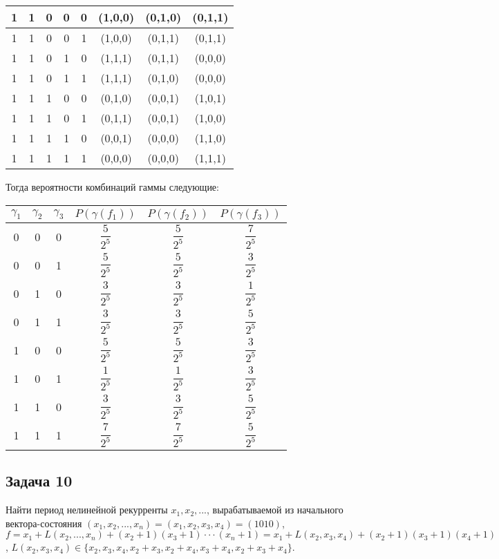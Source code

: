 \documentclass[utf8x, 14pt]{G7-32} %
\begin{document}
\begin{center}
\begin{tabular} { | c | c | c | c | c | c | c | c | }
\hline
1 & 1 & 0 & 0 & 0 & (1,0,0) & (0,1,0) & (0,1,1) \\
\hline
1 & 1 & 0 & 0 & 1 & (1,0,0) & (0,1,1) & (0,1,1) \\
\hline
1 & 1 & 0 & 1 & 0 & (1,1,1) & (0,1,1) & (0,0,0) \\
\hline
1 & 1 & 0 & 1 & 1 & (1,1,1) & (0,1,0) & (0,0,0) \\
\hline
1 & 1 & 1 & 0 & 0 & (0,1,0) & (0,0,1) & (1,0,1) \\
\hline
1 & 1 & 1 & 0 & 1 & (0,1,1) & (0,0,1) & (1,0,0) \\
\hline
1 & 1 & 1 & 1 & 0 & (0,0,1) & (0,0,0) & (1,1,0) \\
\hline
1 & 1 & 1 & 1 & 1 & (0,0,0) & (0,0,0) & (1,1,1) \\
\hline
\end{tabular}
\end{center}

Тогда вероятности комбинаций гаммы следующие:
\renewcommand{\arraystretch}{2}
\begin{center}
\begin{tabular} { | c | c | c | c | c | c | }
\hline
$\gamma_1$ & $\gamma_2$ & $\gamma_3$ & $P(\gamma(f_1))$ & $P(\gamma(f_2))$ & $P(\gamma(f_3))$ \\
\hline\hline
0 & 0 & 0 & $\dfrac{5}{2^5}$ & $\dfrac{5}{2^5}$ & $\dfrac{7}{2^5}$ \\
\hline
0 & 0 & 1 & $\dfrac{5}{2^5}$ & $\dfrac{5}{2^5}$ & $\dfrac{3}{2^5}$ \\
\hline
0 & 1 & 0 & $\dfrac{3}{2^5}$ & $\dfrac{3}{2^5}$ & $\dfrac{1}{2^5}$ \\
\hline
0 & 1 & 1 & $\dfrac{3}{2^5}$ & $\dfrac{3}{2^5}$ & $\dfrac{5}{2^5}$ \\
\hline
1 & 0 & 0 & $\dfrac{5}{2^5}$ & $\dfrac{5}{2^5}$ & $\dfrac{3}{2^5}$ \\
\hline
1 & 0 & 1 & $\dfrac{1}{2^5}$ & $\dfrac{1}{2^5}$ & $\dfrac{3}{2^5}$ \\
\hline
1 & 1 & 0 & $\dfrac{3}{2^5}$ & $\dfrac{3}{2^5}$ & $\dfrac{5}{2^5}$ \\
\hline
1 & 1 & 1 & $\dfrac{7}{2^5}$ & $\dfrac{7}{2^5}$ & $\dfrac{5}{2^5}$ \\
\hline
\end{tabular}
\end{center}

\subsection{Задача 10}
Найти период нелинейной рекурренты $x_1,x_2,...$, вырабатываемой из начального вектора-состояния $(x_1,x_2,...,x_n)= (x_1,x_2,x_3,x_4)=(1010)$, $f=x_1+L(x_2,...,x_n)+(x_2+1)(x_3+1)\cdot\cdot\cdot(x_n+1) = x_1+ L(x_2,x_3,x_4)+(x_2+1)(x_3+1)(x_4+1)$, $L(x_2,x_3,x_4)\in\{x_2,x_3,x_4,x_2+x_3,x_2+x_4,x_3+x_4,x_2+x_3+x_4\}$.
\end{document}
